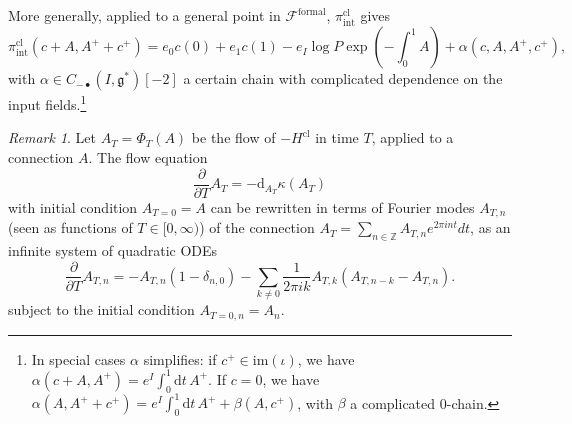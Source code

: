 \documentclass{amsart}
\theoremstyle{plain} %
\theoremstyle{definition}
\theoremstyle{remark}
\newtheorem{rem}[thm]{Remark}
\newcommand{\g}{\mathfrak{g}}
\newcommand{\mr}{\mathrm}
\newcommand{\bt}{\bullet}
\newcommand{\F}{\mathcal{F}}
\newcommand{\ZZ}{\mathbb{Z}}
\newcommand{\dd}{\partial}
\newcommand{\ii}{\mathrm{int}}
\newcommand{\cl}{\mathrm{cl}}
\newcommand{\formal}{\mathrm{formal}}
\newcommand{\dr}{\mathrm{d}}
\begin{document}
More generally, applied to a general point in $\F^\formal$, $\pi_\ii^\cl$ gives
\begin{equation}
    \pi_\ii^\cl(c+A,A^++c^+)=e_0 c(0)+e_1 c(1)- e_I \log P\exp\left(-\int_0^1 A\right)+\alpha(c,A,A^+,c^+),
\end{equation}
with $\alpha\in C_{-\bt}(I,\g^*)[-2]$ a certain chain with complicated dependence on the input fields.\footnote{In special cases $\alpha$ simplifies: if $c^+\in \mr{im}(\iota)$, we have $\alpha(c+A,A^+)=e^I \int_0^1 \dr t\, A^+$. If $c=0$, we have $ \alpha(A,A^++c^+)=e^I \int_0^1 \dr t\, A^+ + \beta(A,c^+)$, with $\beta$ a complicated 0-chain.
}

\begin{rem}
    Let $A_T=\Phi_T(A)$ be the flow of $-H^\cl$ in time $T$, applied to a connection $A$. The flow equation 
    \begin{equation}
        \frac{\dd}{\dd T}A_T = -\dr_{A_T} \kappa(A_T)
    \end{equation}
    with initial condition $A_{T=0}=A$ can be rewritten in terms of Fourier modes $A_{T,n}$ (seen as functions of $T\in [0,\infty)$) of the connection $A_T=\sum_{n\in \ZZ} A_{T,n} e^{2\pi i n t}dt$, as an infinite system of quadratic ODEs
    \begin{equation}
        \frac{\dd}{\dd T} A_{T,n}= - A_{T,n}(1-\delta_{n,0})-\sum_{k\neq 0} \frac{1}{2\pi i k} A_{T,k} (A_{T,n-k}-A_{T,n}).
    \end{equation}
    subject to the initial condition $A_{T=0,n}=A_n$.
\end{rem}
\end{document}
